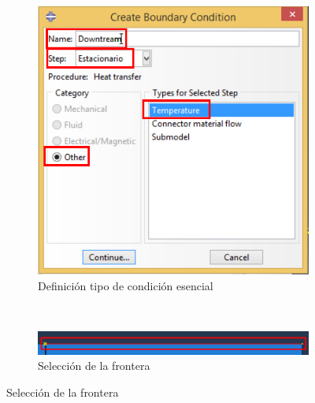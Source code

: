   \begin{figure}[!h]
    \centering
    \begin{subfigure}[!h]{0.42\textwidth}
      \includegraphics[width=\textwidth]{./body/images/load06.pdf}
      \caption{Definición tipo de condición esencial}
      \label{load06}
    \end{subfigure}%
    ~ %
    \begin{subfigure}[!h]{0.55\textwidth}
      \includegraphics[width=\textwidth]{./body/images/load07.pdf}
      \caption{Selección de la frontera}
      \label{load07}
    \end{subfigure}%


\end{figure}
